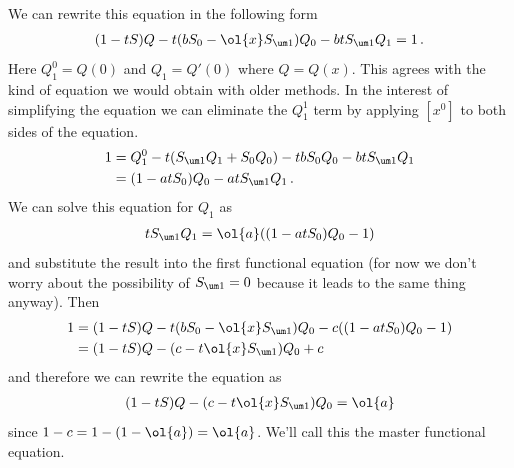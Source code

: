 We can rewrite this equation in the following form
\begin{align}
	(1-tS)Q - t(bS_0-\ol{x}S_{\um 1})Q_0 -btS_{\um 1}Q_1 = 1\,.
\end{align}
Here $Q_1^0 = Q(0)$ and $Q_1 = Q'(0)$ where $Q = Q(x)$. This agrees with the kind of equation we would obtain with older methods. In the interest of simplifying the equation we can eliminate the $Q_1^1$ term by applying $[x^0]$ to both sides of the equation.
\begin{align}
\begin{split}
	 1 &= Q_1^0 - t(S_{\um 1}Q_1 +S_0 Q_0) - tbS_0Q_0 - btS_{\um 1}Q_1\\
	 &=(1-atS_0)Q_0-atS_{\um 1}Q_1\,.
\end{split}
\end{align}
We can solve this equation for $Q_1$ as
\begin{align}
	tS_{\um 1}Q_1 = \ol{a}((1-atS_0)Q_0-1)
\end{align}
and substitute the result into the first functional equation (for now we don't worry about the possibility of $S_{\um 1} = 0$ because it leads to the same thing anyway). Then
\begin{align}
\begin{split}
	1 &= (1-tS)Q - t(bS_0-\ol{x}S_{\um 1})Q_0 - c((1-atS_0)Q_0-1)\\
	& = (1-tS)Q - (c -t\ol{x}S_{\um 1})Q_0 + c
\end{split}
\end{align}
and therefore we can rewrite the equation as
\begin{align}
\begin{split}
	(1-tS)Q - (c -t\ol{x}S_{\um 1})Q_0 = \ol{a}
\end{split}
\end{align}
since $1 - c = 1 - (1-\ol{a}) = \ol{a}$. We'll call this the master functional equation. 

